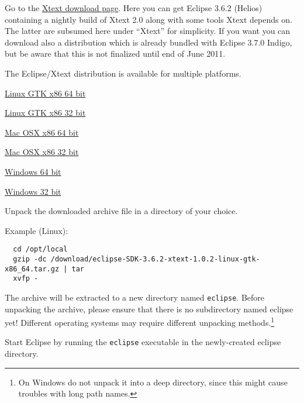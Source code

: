 \begin{compactenum}
    \item Go to the \href{http://download.itemis.com/distros/}{Xtext download
    page}. Here you can get Eclipse 3.6.2 (Helios) containing a nightly build of Xtext 2.0 along with some tools Xtext
    depends on. The latter are subsumed here under
    ``Xtext'' for simplicity.
    If you want you can download also a distribution
    which is already bundled with Eclipse 3.7.0 Indigo, but be aware that this
    is not finalized until end of June 2011.
    \item The Eclipse/Xtext distribution is available for multiple platforms.

    \begin{compactenum}
      \item
      \href{http://download.itemis.com/distros/eclipse-SDK-3.6.2-xtext-nightly-HEAD-linux-gtk-x86_64.tar.gz}{Linux GTK x86 64 bit}
      \item
      \href{http://download.itemis.com/distros/eclipse-SDK-3.6.2-xtext-nightly-HEAD-linux-gtk.tar.gz}{Linux GTK x86 32 bit}
        \item
        \href{http://download.itemis.com/distros/eclipse-SDK-3.6.2-xtext-nightly-HEAD-macosx-cocoa-x86_64.tar.gz}{Mac OSX x86 64 bit}
        \item
        \href{http://download.itemis.com/distros/eclipse-SDK-3.6.2-xtext-nightly-HEAD-macosx-cocoa.tar.gz}{Mac OSX x86 32 bit}
        \item
        \href{http://download.itemis.com/distros/eclipse-SDK-3.6.2-xtext-nightly-HEAD-win32-x86_64.zip}{Windows 64 bit}
        \item
        \href{http://download.itemis.com/distros/eclipse-SDK-3.6.2-xtext-nightly-HEAD-win32.zip}{Windows 32 bit}
    \end{compactenum}

    \item Unpack the downloaded archive file in a directory of your choice.

        Example (Linux):

\begin{lstlisting}
  cd /opt/local
  gzip -dc /download/eclipse-SDK-3.6.2-xtext-1.0.2-linux-gtk-x86_64.tar.gz | tar
  xvfp -
\end{lstlisting}

        The archive will be extracted to a new directory named \texttt{eclipse}. Before
        unpacking the archive, please ensure that there is no subdirectory named
        eclipse yet! Different operating systems may require different unpacking
        methods.\footnote{On Windows do not unpack it into a deep directory,
        since this might cause troubles with long path names.}

    \item Start Eclipse by running the \texttt{eclipse} executable in the newly-created
    eclipse directory.
\end{compactenum}
